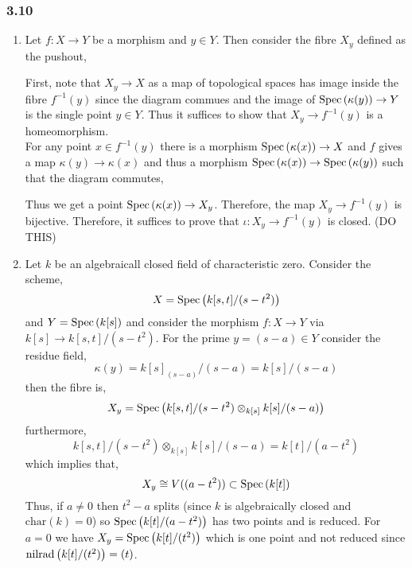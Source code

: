 \documentclass[12pt]{article}
\newcommand{\ch}[1]{\mathrm{char}\left( #1 \right)}
\begin{document}
\subsubsection{3.10}

\begin{enumerate}
\item Let $f : X \to Y$ be a morphism and $y \in Y$. Then consider the fibre $X_y$ defined as the pushout,
\begin{center}
\end{center}
First, note that $X_y \to X$ as a map of topological spaces has image inside the fibre $f^{-1}(y)$ since the diagram commues and the image of $\mathrm{Spec}\left( \kappa(y) \right) \to Y$ is the single point $y \in Y$. Thus it suffices to show that $X_y \to f^{-1}(y)$ is a homeomorphism.
\bigskip\\
For any point $x \in f^{-1}(y)$ there is a morphism $\mathrm{Spec}\left( \kappa(x) \right) \to X$ and $f$ gives a map $\kappa(y) \to \kappa(x)$ and thus a morphism $\mathrm{Spec}\left( \kappa(x) \right) \to \mathrm{Spec}\left( \kappa(y) \right)$ such that the diagram commutes,
\begin{center}
\end{center} 
Thus we get a point $\mathrm{Spec}\left( \kappa(x) \right) \to X_y$. Therefore, the map $X_y \to f^{-1}(y)$ is bijective. Therefore, it suffices to prove that $\iota : X_y \to f^{-1}(y)$ is closed. (DO THIS)
\item Let $k$ be an algebraicall closed field of characteristic zero. Consider the scheme,
\[ X = \mathrm{Spec}\left( k[s,t]/(s - t^2) \right) \]
and $Y = \mathrm{Spec}\left( k[s] \right)$ and consider the morphism $f : X \to Y$ via $k[s] \to k[s,t]/(s - t^2)$. For the prime $y = (s - a) \in Y$ consider the residue field,
\[ \kappa(y) = k[s]_{(s - a)} / (s - a) = k[s]/(s - a) \]
then the fibre is,
\[ X_y = \mathrm{Spec}\left( k[s,t]/(s - t^2) \otimes_{k[s]} k[s]/(s - a) \right) \]
furthermore,
\[ k[s,t]/(s - t^2) \otimes_{k[s]} k[s]/(s - a) = k[t]/(a - t^2) \]
which implies that,
\[ X_y \cong V((a - t^2)) \subset \mathrm{Spec}\left( k[t] \right) \]
Thus, if $a \neq 0$ then $t^2 - a$ splits (since $k$ is algebraically closed and $\ch{k} = 0$) so $\mathrm{Spec}\left( k[t]/(a - t^2) \right)$ has two points and is reduced. For $a = 0$ we have $X_y = \mathrm{Spec}\left( k[t]/(t^2) \right)$ which is one point and not reduced since $\mathrm{nilrad}\left( k[t]/(t^2) \right) = (t)$.  

\end{enumerate}
\end{document}
